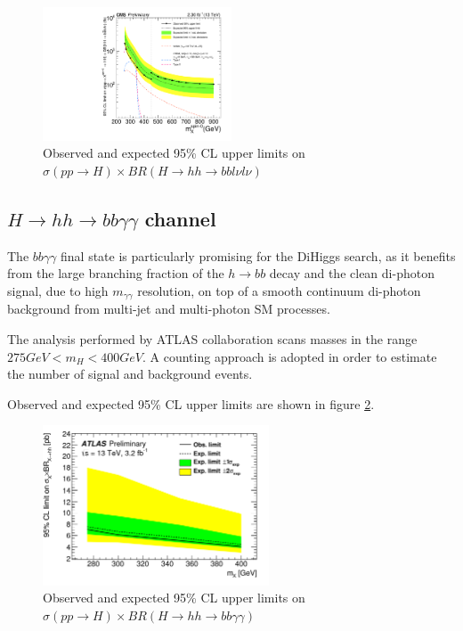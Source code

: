 \begin{figure}[htb]
\centering
	\includegraphics[width=0.5\textwidth, angle=0] {figures/H_hh_bbWW_CMS_BR.pdf}
\caption{Observed and expected 95\% CL upper limits on $\sigma(pp\rightarrow H) \times BR(H \rightarrow hh \rightarrow bbl\nu l\nu)$}
\label{fig:HH_bbWW}   
\end{figure}

\subsection{$H\rightarrow hh \rightarrow bb\gamma\gamma$ channel}

The $bb\gamma\gamma$ final state is particularly promising for the DiHiggs search, as it benefits from the large branching fraction of the $h\rightarrow bb$ decay and the clean di-photon signal, due to high $m_{\gamma\gamma}$ resolution, on top of a smooth continuum di-photon background from multi-jet and multi-photon SM processes. 

The analysis performed by ATLAS collaboration scans masses in the range $275 GeV < m_H < 400 GeV$. A counting approach is adopted in order to estimate the number of signal and background events.

Observed and expected 95\% CL upper limits are shown in figure \ref{fig:HH_bbgg}.
\begin{figure}[htb]
\centering
	\includegraphics[width=0.6\textwidth, angle=0] {figures/H_hh_bbgg_ATLAS_BR.png}
\caption{Observed and expected 95\% CL upper limits on $\sigma(pp\rightarrow H) \times BR(H \rightarrow hh \rightarrow bb\gamma\gamma)$}
\label{fig:HH_bbgg}   
\end{figure}






